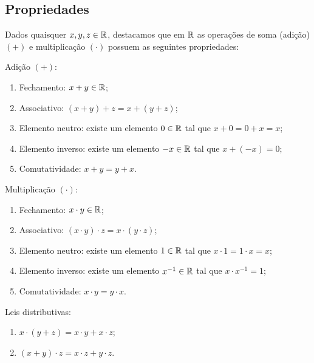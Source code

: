 
\subsection{Propriedades}
Dados quaisquer $x, y, z \in \mathbb{R}$, destacamos que em $\mathbb{R}$ as operações de soma (adição) $(+)$ e multiplicação $(\cdot)$ possuem as seguintes propriedades:

\begin{obs}
 Adição $(+)$:
 \begin{enumerate}[1)]
 \item Fechamento: $x+y \in \mathbb{R}$;
 \item Associativo: $(x+y)+z= x+(y+z)$;
 \item Elemento neutro: existe um elemento $0 \in \mathbb{R}$ tal que $x+0=0+x=x$;
 \item Elemento inverso: existe um elemento $-x \in \mathbb{R}$ tal que $x+(-x)=0$;
 \item Comutatividade: $x+y= y+x$.
 \end{enumerate}
\end{obs}

\begin{obs}
  Multiplicação $(\cdot)$:
 \begin{enumerate}[1)]
 \item Fechamento: $x \cdot y \in \mathbb{R}$;
 \item Associativo: $(x \cdot y) \cdot z= x \cdot (y \cdot z)$;
 \item Elemento neutro: existe um elemento $1 \in \mathbb{R}$ tal que $x \cdot 1= 1 \cdot x= x$;
 \item Elemento inverso: existe um elemento $x^{-1} \in \mathbb{R}$ tal que $x \cdot x^{-1}= 1$;
 \item Comutatividade: $x \cdot y= y \cdot x$.
 \end{enumerate}
\end{obs}

\begin{obs}
  Leis distributivas: 
 \begin{enumerate}[1)]
 \item $x \cdot (y + z)= x \cdot y + x \cdot z$;
 \item $(x + y) \cdot z= x \cdot z + y \cdot z$.
 \end{enumerate}
\end{obs}

